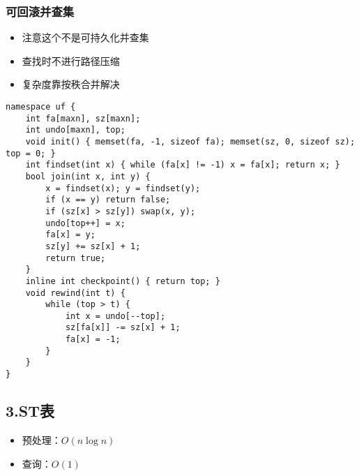 \documentclass[]{article}
\providecommand{\tightlist}{%
  \setlength{\itemsep}{0pt}\setlength{\parskip}{0pt}}
\begin{document}
\hypertarget{ux53efux56deux6edaux5e76ux67e5ux96c6}{%
\subsubsection{可回滚并查集}\label{ux53efux56deux6edaux5e76ux67e5ux96c6}}

\begin{itemize}
\tightlist
\item
  注意这个不是可持久化并查集
\item
  查找时不进行路径压缩
\item
  复杂度靠按秩合并解决
\end{itemize}

\begin{verbatim}
namespace uf {
    int fa[maxn], sz[maxn];
    int undo[maxn], top;
    void init() { memset(fa, -1, sizeof fa); memset(sz, 0, sizeof sz); top = 0; }
    int findset(int x) { while (fa[x] != -1) x = fa[x]; return x; }
    bool join(int x, int y) {
        x = findset(x); y = findset(y);
        if (x == y) return false;
        if (sz[x] > sz[y]) swap(x, y);
        undo[top++] = x;
        fa[x] = y;
        sz[y] += sz[x] + 1;
        return true;
    }
    inline int checkpoint() { return top; }
    void rewind(int t) {
        while (top > t) {
            int x = undo[--top];
            sz[fa[x]] -= sz[x] + 1;
            fa[x] = -1;
        }
    }
}
\end{verbatim}

\hypertarget{stux8868}{%
\subsection{3.ST表}\label{stux8868}}

\begin{itemize}
\tightlist
\item
  预处理：\(O(n \log n)\)
\item
  查询：\(O(1)\)
\end{itemize}
\end{document}
